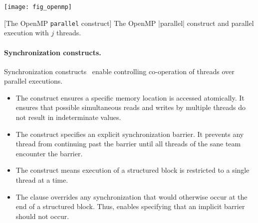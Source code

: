 \begin{center}
\begin{minipage}{.45\textwidth}
\end{minipage}\hfill%
\begin{minipage}{.5\textwidth}
\hfill\texttt{[image: fig\_openmp]}
\end{minipage}
[The OpenMP \texttt{parallel} construct]{
The OpenMP \pr|parallel| construct and parallel execution with \(j\) threads.%
}\label{lst:parallel}
\end{center}

\paragraph*{Synchronization constructs.}
Synchronization constructs~\cite[p. 473--482]{openmp_api} enable controlling co-operation of threads over parallel executions.

\begin{itemize}

\item The  construct ensures a specific memory location is accessed atomically.
It ensures that possible simultaneous reads and writes by multiple threads do not result in indeterminate values.

\item The  construct specifies an explicit synchronization barrier.
It prevents any thread from continuing past the barrier until all threads of the sane team encounter the barrier.

\item The  construct means execution of a structured block is restricted to a single thread at a time.

\item The  clause overrides any synchronization that would otherwise occur at the end of a structured block.
Thus,  enables specifying that an implicit barrier should not occur.

\end{itemize}

